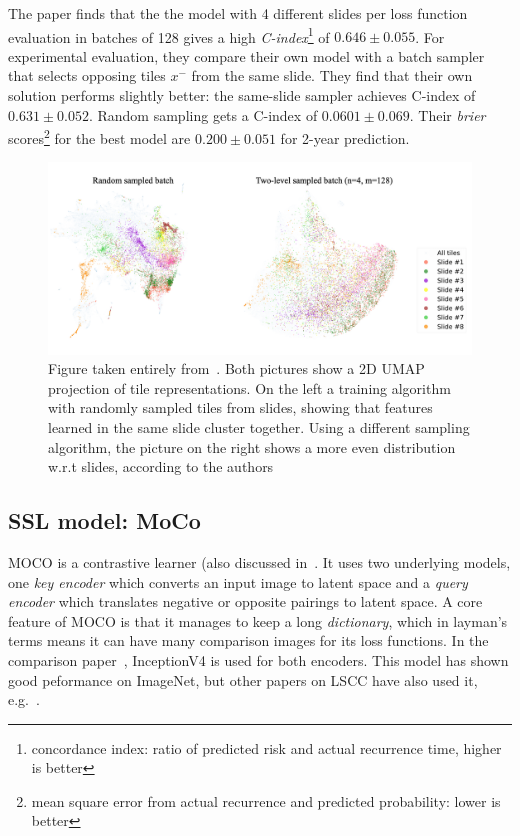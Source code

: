 \documentclass[10pt,twocolumn,letterpaper]{article}
\begin{document}
The paper finds that the the model with 4 different slides per loss function evaluation in batches of 128 gives a high \textit{C-index}\footnote{concordance index: ratio of predicted risk and actual recurrence time, higher is better} of $0.646 \pm 0.055$. For experimental evaluation, they compare their own model with a batch sampler that selects opposing tiles $x^{-}$ from the same slide. They find that their own solution performs slightly better: the same-slide sampler achieves C-index of $0.631 \pm 0.052$. Random sampling gets a C-index of $0.0601 \pm 0.069$. Their \textit{brier} scores\footnote{mean square error from actual recurrence and predicted probability: lower is better} for the best model are $0.200 \pm 0.051$ for 2-year prediction.

\begin{figure}
  \includegraphics[scale=.17]{./umap.png}
  \caption{Figure taken entirely from~\cite{sslUMAP}. Both pictures show a 2D \gls{UMAP} projection of tile representations. On the left a training algorithm with randomly sampled tiles from slides, showing that features learned in the same slide cluster together. Using a different sampling algorithm, the picture on the right shows a more even distribution w.r.t slides, according to the authors}
  \label{fig:umap}
\end{figure}


\subsection{\gls{SSL} model: MoCo}\label{subsec:moco}
\gls{MOCO}\cite{moco} is a contrastive learner (also discussed in~. It uses two underlying models, one \textit{key encoder} which converts an input image to latent space and a \textit{query encoder} which translates negative or opposite pairings to latent space. A core feature of \gls{MOCO} is that it manages to keep a long \textit{dictionary}, which in layman's terms means it can have many comparison images for its loss functions. In the comparison paper~\cite{sslUMAP}, InceptionV4\cite{inceptionV4} is used for both encoders. This model has shown good peformance on ImageNet, but other papers on \gls{LSCC} have also used it, e.g.~\cite{otherInception}.
\end{document}
